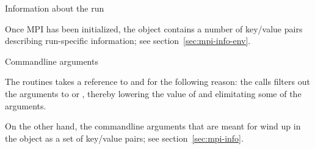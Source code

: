  {Information about the run}

Once MPI has been initialized, the  object
contains a number of key/value pairs describing run-specific
information; see section~\ref{sec:mpi-info-env}.

 {Commandline arguments}

The  routines takes a reference to 
and  for the following reason: the  calls
filters out the arguments to  or ,
thereby lowering the value of  and elimitating some of the 
arguments.

On the other hand, the commandline arguments that are meant for 
wind up in the  object as a set of
key/value pairs; see section~\ref{sec:mpi-info}.

